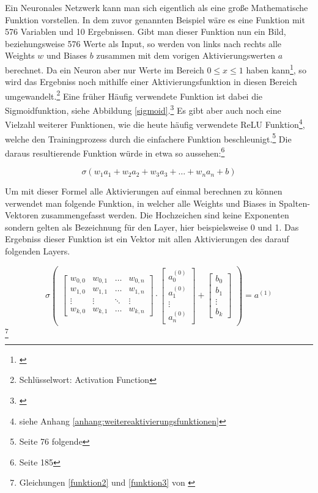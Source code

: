 Ein Neuronales Netzwerk kann man sich eigentlich als eine große Mathematische Funktion vorstellen. In dem zuvor genannten Beispiel wäre es eine Funktion mit 576 Variablen und 10 Ergebnissen. Gibt man dieser Funktion nun ein Bild, beziehungsweise 576 Werte als Input, so werden von links nach rechts alle Weights $w$ und Biases $b$ zusammen mit dem vorigen Aktivierungswerten $a$ berechnet. Da ein Neuron aber nur Werte im Bereich $0\leq x \leq 1$ haben kann\footnote{\cite{3blue1brown}}, so wird das Ergebniss noch mithilfe einer Aktivierungsfunktion in diesen Bereich umgewandelt.\footnote{\cite{googleMlGlossar} Schlüsselwort: Activation Function} Eine früher Häufig verwendete Funktion ist dabei die Sigmoidfunktion, siehe Abbildung \ref{sigmoid}.\footnote{\cite{3blue1brown}} Es gibt aber auch noch eine Vielzahl weiterer Funktionen, wie die heute häufig verwendete ReLU Funktion\footnote{siehe Anhang \ref{anhang:weitereaktivierungsfunktionen}}, welche den Trainingprozess durch die einfachere Funktion beschleunigt.\footnote{\cite{nnfs} Seite 76 folgende} Die daraus resultierende Funktion würde in etwa so aussehen:\footnote{\cite{nnfs} Seite 185}

\begin{equation}\label{funktion1}
    \sigma(w_1a_1+w_2a_2+w_3a_3+ \ldots +w_na_n+b)
\end{equation}

Um mit dieser Formel alle Aktivierungen auf einmal berechnen zu können verwendet man folgende Funktion, in welcher alle Weights und Biases in Spalten-Vektoren zusammengefasst werden. Die Hochzeichen sind keine Exponenten sondern gelten als Bezeichnung für den Layer, hier beispielsweise 0 und 1. Das Ergebniss dieser Funktion ist ein Vektor mit allen Aktivierungen des darauf folgenden Layers.

\begin{equation}\label{funktion2}
    \sigma
    \begin{pmatrix}
        \begin{bmatrix}
            w_{0,0} & w_{0,1} & \ldots & w_{0,n} \\
            w_{1,0} & w_{1,1} & \ldots & w_{1,n} \\
            \vdots  & \vdots  & \ddots & \vdots  \\
            w_{k,0} & w_{k,1} & \ldots & w_{k,n}
        \end{bmatrix}
        \cdot
        \begin{bmatrix}
            a_0^{(0)} \\a_1^{(0)}\\\vdots\\a_n^{(0)}
        \end{bmatrix}
        +
        \begin{bmatrix}
            b_0 \\b_1\\\vdots\\b_k
        \end{bmatrix}
    \end{pmatrix}
    =
    a^{(1)}
\end{equation}\footnote{Gleichungen \ref{funktion2} und \ref{funktion3} von \cite{3blue1brown}}


